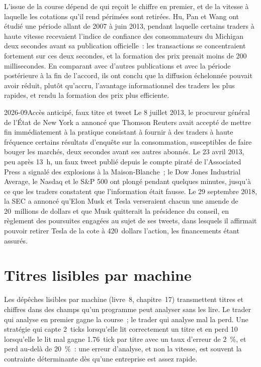 L'issue de la course dépend de qui reçoit le chiffre en premier, et de la vitesse à laquelle les cotations qu'il rend périmées sont retirées. Hu, Pan et Wang ont étudié une
période allant de 2007 à juin 2013, pendant laquelle certains traders à haute vitesse recevaient l'indice de confiance des consommateurs du Michigan deux secondes avant sa publication officielle~:
les transactions se concentraient fortement sur ces deux secondes, et la formation des prix prenait moins de 200 millisecondes. En comparant avec d'autres publications et
avec la période postérieure à la fin de l'accord, ils ont conclu que la diffusion échelonnée pouvait avoir réduit, plutôt qu'accru, l'avantage informationnel des traders
les plus rapides, et rendu la formation des prix plus efficiente.

\begin{dated}{2026-09}{Accès anticipé, faux titre et tweet}\label{dat:hf:news-and-event-trading:events}
Le 8 juillet 2013, le procureur général de l'État de New York a annoncé que Thomson Reuters avait accepté de mettre fin immédiatement à la pratique consistant à fournir
à des traders à haute fréquence certains résultats d'enquête sur la consommation, susceptibles de faire bouger les marchés, deux secondes avant ses autres abonnés. Le 23 avril 2013, peu après
13~h, un faux tweet publié depuis le compte piraté de l'Associated Press a signalé des explosions à la Maison-Blanche~; le Dow Jones Industrial Average, le
Nasdaq et le S\&P 500 ont plongé pendant quelques minutes, jusqu'à ce que les traders constatent que l'information était fausse. Le 29 septembre 2018, la SEC a annoncé qu'Elon Musk
et Tesla verseraient chacun une amende de 20~millions de dollars et que Musk quitterait la présidence du conseil, en règlement des poursuites engagées au sujet de ses tweets, dans lesquels il affirmait pouvoir retirer Tesla
de la cote à 420~dollars l'action, les financements étant assurés.
\end{dated}

\section{Titres lisibles par machine}

Les dépêches lisibles par machine (livre~8, chapitre~17) transmettent titres et chiffres dans des champs qu'un programme peut analyser sans les lire. Le trader qui
analyse en premier gagne la course~; le trader qui analyse mal la perd. Une stratégie qui capte 2~ticks lorsqu'elle lit correctement un titre et en perd 10
lorsqu'elle le lit mal gagne 1.76~tick par titre avec un taux d'erreur de 2~\%, et perd au-delà de 20~\%~: une erreur d'analyse, et non la vitesse, est souvent
la contrainte déterminante dès qu'une entreprise est assez rapide.

